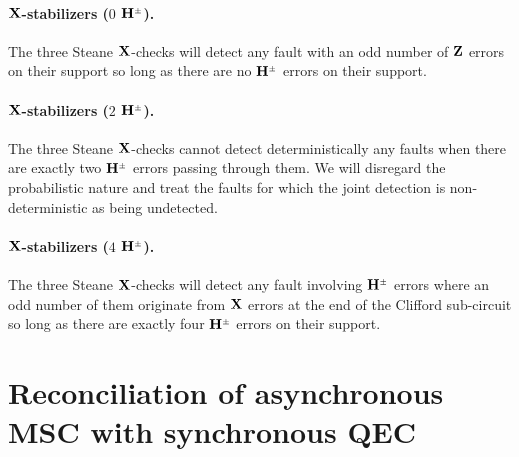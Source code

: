 \documentclass{article}
\newcommand{\Sup}[1]{^{\scriptscriptstyle #1}}
\newcommand{\Op}[1]{{\bf #1}}
\begin{document}
	\paragraph{$\Op{X}$-stabilizers ($0$ $\Op{H}\Sup{\pm}$).} The three Steane $\Op{X}$-checks will detect any fault with an odd number of $\Op{Z}$ errors on their support so long as there are no $\Op{H}\Sup{\pm}$ errors on their support.

	\paragraph{$\Op{X}$-stabilizers ($2$ $\Op{H}\Sup{\pm}$).} The three Steane $\Op{X}$-checks cannot detect deterministically any faults when there are exactly two $\Op{H}\Sup{\pm}$ errors passing through them. We will disregard the probabilistic nature and treat the faults for which the joint detection is non-deterministic as being undetected.
	
	\paragraph{$\Op{X}$-stabilizers ($4$ $\Op{H}\Sup{\pm}$).} The three Steane $\Op{X}$-checks will detect any fault involving $\Op{H}\Sup{\pm}$ errors where an odd number of them originate from $\Op{X}$ errors at the end of the Clifford sub-circuit so long as there are exactly four $\Op{H}\Sup{\pm}$ errors on their support.

	\newpage

	\section{Reconciliation of asynchronous MSC with synchronous QEC}
\end{document}
